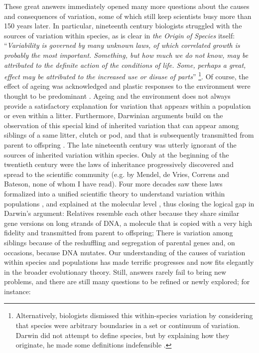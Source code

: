 These great answers immediately opened many more questions about the causes and consequences of variation, some of which still keep scientists busy more than 150 years later. In particular, nineteenth century biologists struggled with the sources of variation within species, as is clear in \emph{the Origin of Species} itself:  ``\emph{Variability is governed by many unknown laws, of which correlated growth is probably the most important. Something, but how much we do not know, may be attributed to the definite action of the conditions of life. Some, perhaps a great, effect may be attributed to the increased use or disuse of parts}'' \parencite[p. 31][]{Darwin1859} \footnote{Alternatively, biologists dismissed this within-species variation by considering that species were arbitrary boundaries in a set or continuum of variation. Darwin did not attempt to define species, but by explaining how they originate, he made some definitions indefensible \parencite[][pp. 129-163]{Wilkins2009}.}. Of course, the effect of ageing was acknowledged and plastic responses to the environment were thought to be predominant \parencite{Wilkins2009}. Ageing and the environment does not always provide a satisfactory explanation for variation that appears within a population or even within a litter.
Furthermore, Darwinian arguments build on the observation of this special kind of inherited variation that can appear among siblings of a same litter, clutch or pod, and that is subsequently transmitted from parent to offspring \parencite[][Chapter 1]{Darwin1859}. The late nineteenth century was utterly ignorant of the sources of inherited variation within species. Only at the beginning of the twentieth century were the laws of inheritance progressively discovered and spread to the scientific community (e.g. by Mendel, de Vries, Correns and Bateson, none of whom I have read). Four more decades saw these laws formalized into a unified scientific theory to understand variation within populations \parencite{Fisher1930}, and explained at the molecular level \parencite{Oswald1943, Watson1953}, thus closing the logical gap in Darwin's argument: Relatives resemble each other because they share similar gene versions on long strands of DNA, a molecule that is copied with a very high fidelity and transmitted from parent to offspring; There is variation among siblings because of the reshuffling and segregation of parental genes and, on occasions, because DNA mutates. 
Our understanding of the causes of variation within species and populations has made terrific progresses and now fits elegantly in the broader evolutionary theory. Still, answers rarely fail to bring new problems, and there are still many questions to be refined or newly explored; for instance:
